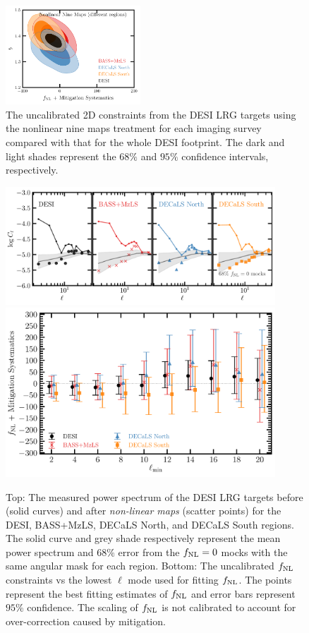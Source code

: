 \begin{figure}
    \centering
    \includegraphics[width=0.45\textwidth]{figures/mcmc_dr9regions.pdf} 
    \caption{The uncalibrated 2D constraints from the DESI LRG targets using the nonlinear nine maps treatment for each imaging survey compared with that for the whole DESI footprint. The dark and light shades represent the $68\%$ and $95\%$ confidence intervals, respectively.}\label{fig:mcmc_dr9reg}
\end{figure}
\begin{figure}
    \centering
    \includegraphics[width=0.9\textwidth]{figures/cldr9_lowell.pdf}
    \includegraphics[width=0.9\textwidth]{figures/fnl_elmin.pdf}  
    \caption{Top: The measured power spectrum of the DESI LRG targets before (solid curves) and after \textit{non-linear  maps} (scatter points) for the DESI, BASS+MzLS, DECaLS North, and DECaLS South regions. The solid curve and grey shade respectively represent the mean power spectrum and $68\%$ error from the $f_{\rm NL}=0$ mocks with the same angular mask for each region. Bottom: The uncalibrated $f_{\rm NL}$ constraints vs the lowest $\ell$ mode used for fitting $f_{\rm NL}$. The points represent the best fitting estimates of $f_{\rm NL}$ and error bars represent $95$\% confidence. The scaling of $f_{\rm NL}$ is not calibrated to account for over-correction caused by mitigation.}\label{fig:mcmc_dr9elmin}
\end{figure}


